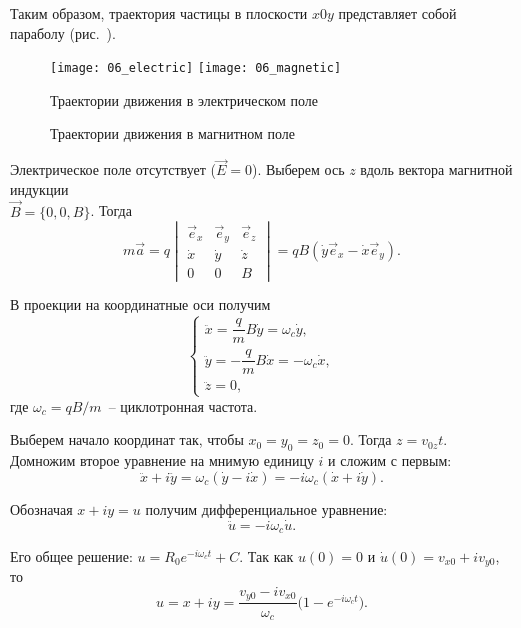 Таким образом, траектория частицы в плоскости \( x0y \) представляет собой
параболу (рис.~).

\begin{figure}[h!]
  \center
  \texttt{[image: 06\_electric]} \hspace{1em}
  \texttt{[image: 06\_magnetic]} \\
  \parbox{.3\textwidth}{\caption{Траектории движения в электрическом поле}
    \label{pic06el}} \hspace{1em}
  \parbox{.5\textwidth}{\caption{Траектории движения в магнитном поле}
    \label{pic06mag}}
\end{figure}


Электрическое поле отсутствует (\( \vec{E} = 0 \)). Выберем ось \( z \) вдоль
вектора магнитной индукции\\ \( \vec{B} = \big\{ 0, 0, B \big\} \). Тогда
\[
  m\vec{a} = q
  \begin{vmatrix}
    \vec{e}_x & \vec{e}_y & \vec{e}_z \\
      \dot{x} &   \dot{y} &   \dot{z} \\
            0 &         0 &         B
  \end{vmatrix}
  = qB\left( \dot{y}\vec{e}_x - \dot{x}\vec{e}_y \right).
\]

В проекции на координатные оси получим
\[
  \left\{
    \begin{array}{l}
      \ddot{x} = \dfrac{q}{m}B\dot{y} = \omega_c\dot{y}, \\[.5em]
      \ddot{y} = -\dfrac{q}{m}B\dot{x} = -\omega_c\dot{x}, \\[.5em]
      \ddot{z} = 0,
    \end{array}
  \right.
\]
где \( \omega_c = qB / m \)~-- циклотронная частота.

Выберем начало координат так, чтобы \( x_0 = y_0 = z_0 = 0 \). Тогда
\( z = v_{0z}t \). Домножим второе уравнение на мнимую единицу \( i \) и сложим
с первым:
\[
  \ddot{x} + i\ddot{y} = \omega_c (\dot{y} - i\dot{x}) =
    -i\omega_c(\dot{x} + i\dot{y}).
\]

Обозначая \( x + iy = u \) получим дифференциальное уравнение:
\[
  \ddot{u} = -i\omega_c\dot{u}.
\]

Его общее решение: \( u = R_0 e^{-i\omega_c t} + C \). Так как \( u(0) = 0 \)
и \( \dot{u}(0) = v_{x0} + iv_{y0} \), то
\[
  u = x + iy = \frac{v_{y0} - iv_{x0}}{\omega_c}
    \Big( 1 - e^{-i\omega_c t} \Big).
\]

